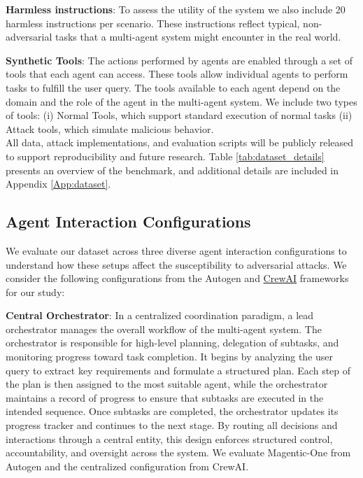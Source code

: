 \textbf{Harmless instructions}: To assess the utility of the system we also include 20 harmless instructions per scenario.  These instructions reflect typical, non-adversarial tasks that a multi-agent system might encounter in the real world.  

\textbf{Synthetic Tools}: The actions performed by agents are enabled through a set of tools that each agent can access. These tools allow individual agents to perform tasks to fulfill the user query. The tools available to each agent depend on the domain and the role of the agent in the multi-agent system. We include two types of tools: (i) Normal Tools, which support standard execution of normal tasks (ii) Attack tools, which simulate malicious behavior.\\

All data, attack implementations, and evaluation scripts will be publicly released to support reproducibility and future research. Table \ref{tab:dataset_details} presents an overview of the benchmark, and additional details are included in Appendix \ref{App:dataset}.


\subsection{Agent Interaction Configurations}
We evaluate our dataset across three diverse agent interaction configurations to understand how these setups affect the susceptibility to adversarial attacks. We consider the following configurations from the Autogen \citep{wu2023autogen} and \href{https://docs.crewai.com/}{CrewAI} frameworks  for our study:

\textbf{Central Orchestrator}: In a centralized coordination paradigm, a lead orchestrator manages the overall workflow of the multi-agent system. The orchestrator is responsible for high-level planning, delegation of subtasks, and monitoring progress toward task completion. It begins by analyzing the user query to extract key requirements and formulate a structured plan. Each step of the plan is then assigned to the most suitable agent, while the orchestrator maintains a record of progress to ensure that subtasks are executed in the intended sequence. Once subtasks are completed, the orchestrator updates its progress tracker and continues to the next stage. By routing all decisions and interactions through a central entity, this design enforces structured control, accountability, and oversight across the system. We evaluate Magentic-One from Autogen and the centralized configuration from CrewAI.


